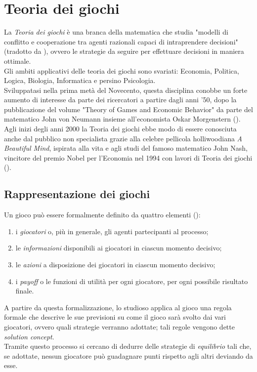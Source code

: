 \section{Teoria dei giochi}

La \emph{Teoria dei giochi} è una branca della matematica che studia "modelli di conflitto e cooperazione tra agenti razionali capaci di intraprendere decisioni" (tradotto da \cite{gtheory}), ovvero le strategie da seguire per effettuare decisioni in maniera ottimale.\\
Gli ambiti applicativi delle teoria dei giochi sono svariati: Economia, Politica, Logica, Biologia, Informatica e persino Psicologia.\\
Sviluppatasi nella prima metà del Novecento, questa disciplina conobbe un forte aumento di interesse da parte dei ricercatori a partire dagli anni '50, dopo la pubblicazione del volume "Theory of Games and Economic Behavior" da parte del matematico John von Neumann insieme all'economista Oskar Morgenstern (\cite{tog}). Agli inizi degli anni 2000 la Teoria dei giochi ebbe modo di essere conosciuta anche dal pubblico non specialista grazie alla celebre pellicola holliwoodiana \emph{A Beautiful Mind}, ispirata alla vita e agli studi del famoso matematico John Nash, vincitore del premio Nobel per l'Economia nel 1994 con lavori di Teoria dei giochi (\cite{jnash}).


\subsection{Rappresentazione dei giochi}

Un gioco può essere formalmente definito da quattro elementi (\cite{ramusen}):
\begin{enumerate}
   \item i \emph{giocatori} o, più in generale, gli agenti partecipanti al processo;
   \item le \emph{informazioni} disponibili ai giocatori in ciascun momento decisivo;
   \item le \emph{azioni} a disposizione dei giocatori in ciascun momento decisivo;
   \item i \emph{payoff} o le funzioni di utilità per ogni giocatore, per ogni possibile risultato finale.   
\end{enumerate}

A partire da questa formalizzazione, lo studioso applica al gioco una regola formale che descrive le sue previsioni su come il gioco sarà svolto dai vari giocatori, ovvero quali strategie verranno adottate; tali regole vengono dette \emph{solution concept}.\\
Tramite questo processo si cercano di dedurre delle strategie di \emph{equilibrio} tali che, se adottate, nessun giocatore può guadagnare punti rispetto agli altri deviando da esse.


